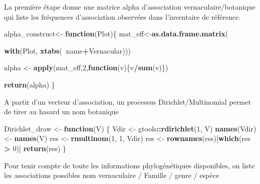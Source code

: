 \documentclass[
  11pt,
  french,
  A4paper,
  extrafontsizes,onecolumn,openright
  ]{memoir}
\newenvironment{Shaded}{\begin{snugshade}}{\end{snugshade}}
\newcommand{\KeywordTok}[1]{\textcolor[rgb]{0.13,0.29,0.53}{\textbf{#1}}}
\newcommand{\DecValTok}[1]{\textcolor[rgb]{0.00,0.00,0.81}{#1}}
\newcommand{\StringTok}[1]{\textcolor[rgb]{0.31,0.60,0.02}{#1}}
\newcommand{\ControlFlowTok}[1]{\textcolor[rgb]{0.13,0.29,0.53}{\textbf{#1}}}
\newcommand{\OperatorTok}[1]{\textcolor[rgb]{0.81,0.36,0.00}{\textbf{#1}}}
\newcommand{\NormalTok}[1]{#1}
\begin{document}
La première étape donne une matrice alpha d'association
vernaculaire/botanique qui liste les fréquences d'association observées
dans l'inventaire de référence.

\begin{Shaded}
\begin{Highlighting}[]
\NormalTok{alpha_construct<-}\StringTok{  }\ControlFlowTok{function}\NormalTok{(Plot)\{}
\NormalTok{  mat_eff<-}\KeywordTok{as.data.frame.matrix}\NormalTok{(}
    
    \KeywordTok{with}\NormalTok{(Plot, }\KeywordTok{xtabs}\NormalTok{(}\OperatorTok{~}\NormalTok{name}\OperatorTok{+}\NormalTok{Vernacular)))}
  
\NormalTok{  alpha <-}\StringTok{ }\KeywordTok{apply}\NormalTok{(mat_eff,}\DecValTok{2}\NormalTok{,}\ControlFlowTok{function}\NormalTok{(v)\{v}\OperatorTok{/}\KeywordTok{sum}\NormalTok{(v)\})}
  
  \KeywordTok{return}\NormalTok{(alpha)}
\NormalTok{\}}
\end{Highlighting}
\end{Shaded}

A partir d'un vecteur d'association, un processus Dirichlet/Multinomial
permet de tirer au hasard un nom botanique

\begin{Shaded}
\begin{Highlighting}[]
\NormalTok{Dirichlet_draw <-}\StringTok{ }\ControlFlowTok{function}\NormalTok{(V) \{}
\NormalTok{    Vdir <-}\StringTok{ }\NormalTok{gtools}\OperatorTok{::}\KeywordTok{rdirichlet}\NormalTok{(}\DecValTok{1}\NormalTok{, V)}
    \KeywordTok{names}\NormalTok{(Vdir) <-}\StringTok{ }\KeywordTok{names}\NormalTok{(V)}
\NormalTok{    res <-}\StringTok{ }\KeywordTok{rmultinom}\NormalTok{(}\DecValTok{1}\NormalTok{, }\DecValTok{1}\NormalTok{, Vdir)}
\NormalTok{    res <-}\StringTok{ }\KeywordTok{rownames}\NormalTok{(res)[}\KeywordTok{which}\NormalTok{(res }\OperatorTok{>}\StringTok{ }\DecValTok{0}\NormalTok{)]}
    \KeywordTok{return}\NormalTok{(res)}
\NormalTok{\}}
\end{Highlighting}
\end{Shaded}

Pour tenir compte de toute les informations phylogénétiques disponibles,
on liste les associations possibles nom vernaculaire / Famille / genre /
espèce
\end{document}
